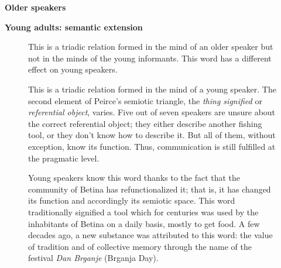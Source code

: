 	\begin{minipage}[t]{0.29\textwidth}
		\centering
		\textbf{Older speakers}
	\end{minipage}%
	\hspace{.05\textwidth}%
	\begin{minipage}[t]{0.63\textwidth}
		\centering
		\textbf{Young adults: semantic extension}
	\end{minipage}%
	\newline\newline%
	\begin{subfigure}[t]{0.29\textwidth}
		{\centering
		}
		
		 This is a triadic relation formed in the mind of an older speaker but not in the minds of the young informants.
		 This word has a different effect on young speakers.
	\end{subfigure}%
	\hspace{.05\textwidth}%
	\begin{subfigure}[t]{0.29\textwidth}
		{\centering
		}
		
		This is a triadic relation formed in the mind of a young speaker.
		The second element of Peirce's semiotic triangle, the \emph{thing signified} or \emph{referential object}, varies.
		Five out of seven speakers are unsure about the correct referential object; they either describe another fishing tool, or they don't know how to describe it.
		But all of them, without exception, know its function.
		Thus, communication is still fulfilled at the pragmatic level.
	\end{subfigure}%
	\hspace{.05\textwidth}%
	\begin{subfigure}[t]{0.29\textwidth}
		{\centering
		}
		
		Young speakers know this word thanks to the fact that the community of Betina has refunctionalized it; that is, it has changed its function and accordingly its semiotic space.
		This word traditionally signified a tool which for centuries was used by the inhabitants of Betina on a daily basis, mostly to get food.
		A few decades ago, a new substance was attributed to this word: the value of tradition and of collective memory through the name of the festival \emph{Dan Brganje} (Brganja Day).
	\end{subfigure}%

